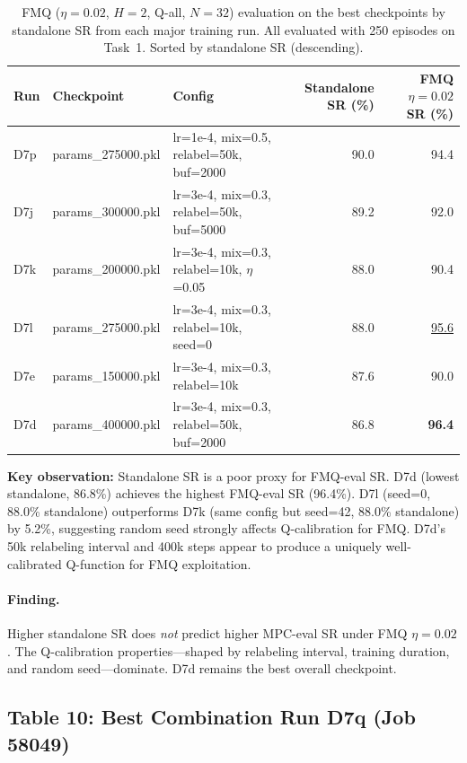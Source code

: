 \documentclass[11pt]{article}
\newcommand{\best}[1]{\textbf{#1}}
\newcommand{\ours}[1]{\underline{#1}}
\begin{document}
\begin{table}[h]
\centering
\caption{FMQ ($\eta=0.02$, $H=2$, Q-all, $N=32$) evaluation on the best checkpoints
  by standalone SR from each major training run.
  All evaluated with 250 episodes on Task~1.
  Sorted by standalone SR (descending).}
\begin{tabular}{lllrr}
\toprule
Run & Checkpoint & Config & Standalone SR (\%) & FMQ $\eta=0.02$ SR (\%) \\
\midrule
D7p & params\_275000.pkl & lr=1e-4, mix=0.5, relabel=50k, buf=2000 & 90.0 & 94.4 \\
D7j & params\_300000.pkl & lr=3e-4, mix=0.3, relabel=50k, buf=5000 & 89.2 & 92.0 \\
D7k & params\_200000.pkl & lr=3e-4, mix=0.3, relabel=10k, $\eta$=0.05 & 88.0 & 90.4 \\
D7l & params\_275000.pkl & lr=3e-4, mix=0.3, relabel=10k, seed=0   & 88.0 & \ours{95.6} \\
D7e & params\_150000.pkl & lr=3e-4, mix=0.3, relabel=10k            & 87.6 & 90.0 \\
D7d & params\_400000.pkl & lr=3e-4, mix=0.3, relabel=50k, buf=2000  & 86.8 & \best{96.4} \\
\bottomrule
\end{tabular}

\medskip
\footnotesize
\textbf{Key observation:} Standalone SR is a poor proxy for FMQ-eval SR.
D7d (lowest standalone, 86.8\%) achieves the highest FMQ-eval SR (96.4\%).
D7l (seed=0, 88.0\% standalone) outperforms D7k (same config but seed=42, 88.0\% standalone)
by 5.2\%, suggesting random seed strongly affects Q-calibration for FMQ.
D7d's 50k relabeling interval and 400k steps appear to produce a uniquely
well-calibrated Q-function for FMQ exploitation.
\normalsize
\end{table}

\paragraph{Finding.}
Higher standalone SR does \emph{not} predict higher MPC-eval SR under FMQ $\eta=0.02$.
The Q-calibration properties---shaped by relabeling interval, training duration,
and random seed---dominate. D7d remains the best overall checkpoint.

\subsection*{Table 10: Best Combination Run D7q (Job 58049)}
\end{document}
